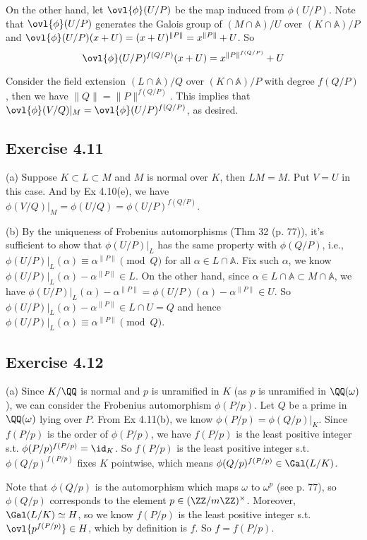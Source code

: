 \documentclass[../Chapter.tex]{subfiles}
\begin{document}
On the other hand, let $\ovl{\phi}(U/P)$ be the map induced from $\phi(U/P)$. Note that $\ovl{\phi}(U/P)$ generates the Galois group of $(M\cap\mathbb{A})/U$ over $(K\cap\mathbb{A})/P$ and $\ovl{\phi}(U/P)(x+U)=(x+U)^{\|P\|}=x^{\|P\|}+U$. So $$\ovl{\phi}(U/P)^{f(Q/P)}(x+U)=x^{\|P\|^{f(Q/P)}}+U$$

Consider the field extension $(L\cap\mathbb{A})/Q$ over $(K\cap\mathbb{A})/P$ with degree $f(Q/P)$, then we have $\|Q\|=\|P\|^{f(Q/P)}$. This implies that $\ovl{\phi}(V/Q)|_M=\ovl{\phi}(U/P)^{f(Q/P)}$, as desired.

\subsection*{Exercise 4.11}

(a) Suppose $K\subset L\subset M$ and $M$ is normal over $K$, then $LM=M$. Put $V=U$ in this case. And by Ex 4.10(e), we have $\phi(V/Q)|_M=\phi(U/Q)=\phi(U/P)^{f(Q/P)}$.

(b) By the uniqueness of Frobenius automorphisms (Thm 32 (p. 77)), it's sufficient to show that $\phi(U/P)|_L$ has the same property with $\phi(Q/P)$, i.e., $\phi(U/P)|_L(\alpha)\equiv\alpha^{\|P\|} \pmod{Q}$ for all $\alpha\in L\cap\mathbb{A}$. Fix such $\alpha$, we know $\phi(U/P)|_L(\alpha)-\alpha^{\|P\|}\in L$. On the other hand, since $\alpha\in L\cap\mathbb{A}\subset M\cap\mathbb{A}$, we have $\phi(U/P)|_L(\alpha)-\alpha^{\|P\|}=\phi(U/P)(\alpha)-\alpha^{\|P\|}\in U$. So $\phi(U/P)|_L(\alpha)-\alpha^{\|P\|} \in L\cap U=Q$ and hence $\phi(U/P)|_L(\alpha)\equiv\alpha^{\|P\|} \pmod{Q}$.

\subsection*{Exercise 4.12}

(a) Since $K/\QQ$ is normal and $p$ is unramified in $K$ (as $p$ is unramified in $\QQ(\omega)$), we can consider the Frobenius automorphism $\phi(P/p)$. Let $Q$ be a prime in $\QQ(\omega)$ lying over $P$. From Ex 4.11(b), we know $\phi(P/p)=\phi(Q/p)|_K$. Since $f(P/p)$ is the order of $\phi(P/p)$, we have $f(P/p)$ is the least positive integer s.t. $\phi(P/p)^{f(P/p)}=\id_K$. So $f(P/p)$ is the least positive integer s.t. $\phi(Q/p)^{f(P/p)}$ fixes $K$ pointwise, which means $\phi(Q/p)^{f(P/p)}\in\Gal(L/K)$.

Note that $\phi(Q/p)$ is the automorphism which maps $\omega$ to $\omega^p$ (see p. 77), so $\phi(Q/p)$ corresponds to the element $p\in(\ZZ/m\ZZ)^\times$. Moreover, $\Gal(L/K)\simeq H$, so we know $f(P/p)$ is the least positive integer s.t. $\ovl{p^{f(P/p)}}\in H$, which by definition is $f$. So $f=f(P/p)$.
\end{document}
